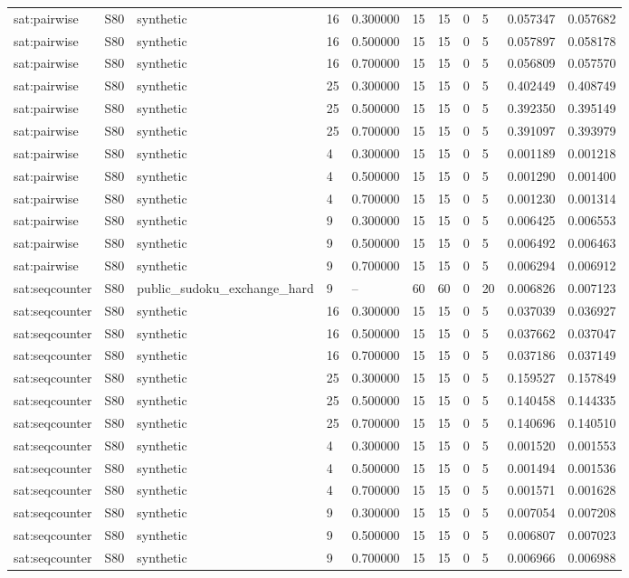 \begin{tabular}{lllllllllll}
sat:pairwise & S80 & synthetic & 16 & 0.300000 & 15 & 15 & 0 & 5 & 0.057347 & 0.057682 \\
sat:pairwise & S80 & synthetic & 16 & 0.500000 & 15 & 15 & 0 & 5 & 0.057897 & 0.058178 \\
sat:pairwise & S80 & synthetic & 16 & 0.700000 & 15 & 15 & 0 & 5 & 0.056809 & 0.057570 \\
sat:pairwise & S80 & synthetic & 25 & 0.300000 & 15 & 15 & 0 & 5 & 0.402449 & 0.408749 \\
sat:pairwise & S80 & synthetic & 25 & 0.500000 & 15 & 15 & 0 & 5 & 0.392350 & 0.395149 \\
sat:pairwise & S80 & synthetic & 25 & 0.700000 & 15 & 15 & 0 & 5 & 0.391097 & 0.393979 \\
sat:pairwise & S80 & synthetic & 4 & 0.300000 & 15 & 15 & 0 & 5 & 0.001189 & 0.001218 \\
sat:pairwise & S80 & synthetic & 4 & 0.500000 & 15 & 15 & 0 & 5 & 0.001290 & 0.001400 \\
sat:pairwise & S80 & synthetic & 4 & 0.700000 & 15 & 15 & 0 & 5 & 0.001230 & 0.001314 \\
sat:pairwise & S80 & synthetic & 9 & 0.300000 & 15 & 15 & 0 & 5 & 0.006425 & 0.006553 \\
sat:pairwise & S80 & synthetic & 9 & 0.500000 & 15 & 15 & 0 & 5 & 0.006492 & 0.006463 \\
sat:pairwise & S80 & synthetic & 9 & 0.700000 & 15 & 15 & 0 & 5 & 0.006294 & 0.006912 \\
sat:seqcounter & S80 & public\_sudoku\_exchange\_hard & 9 & -- & 60 & 60 & 0 & 20 & 0.006826 & 0.007123 \\
sat:seqcounter & S80 & synthetic & 16 & 0.300000 & 15 & 15 & 0 & 5 & 0.037039 & 0.036927 \\
sat:seqcounter & S80 & synthetic & 16 & 0.500000 & 15 & 15 & 0 & 5 & 0.037662 & 0.037047 \\
sat:seqcounter & S80 & synthetic & 16 & 0.700000 & 15 & 15 & 0 & 5 & 0.037186 & 0.037149 \\
sat:seqcounter & S80 & synthetic & 25 & 0.300000 & 15 & 15 & 0 & 5 & 0.159527 & 0.157849 \\
sat:seqcounter & S80 & synthetic & 25 & 0.500000 & 15 & 15 & 0 & 5 & 0.140458 & 0.144335 \\
sat:seqcounter & S80 & synthetic & 25 & 0.700000 & 15 & 15 & 0 & 5 & 0.140696 & 0.140510 \\
sat:seqcounter & S80 & synthetic & 4 & 0.300000 & 15 & 15 & 0 & 5 & 0.001520 & 0.001553 \\
sat:seqcounter & S80 & synthetic & 4 & 0.500000 & 15 & 15 & 0 & 5 & 0.001494 & 0.001536 \\
sat:seqcounter & S80 & synthetic & 4 & 0.700000 & 15 & 15 & 0 & 5 & 0.001571 & 0.001628 \\
sat:seqcounter & S80 & synthetic & 9 & 0.300000 & 15 & 15 & 0 & 5 & 0.007054 & 0.007208 \\
sat:seqcounter & S80 & synthetic & 9 & 0.500000 & 15 & 15 & 0 & 5 & 0.006807 & 0.007023 \\
sat:seqcounter & S80 & synthetic & 9 & 0.700000 & 15 & 15 & 0 & 5 & 0.006966 & 0.006988 \\
\hline
\end{tabular}
